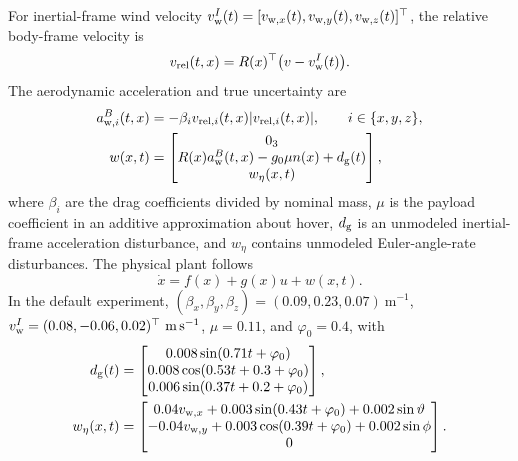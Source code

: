 \documentclass[11pt]{article}
\begin{document}
For inertial-frame wind velocity
$v_{\rm w}^I(t)=[v_{{\rm w},x}(t),v_{{\rm w},y}(t),v_{{\rm w},z}(t)]^\top$,
the relative body-frame velocity is
\begin{equation}
    v_{\rm rel}(t,x)=R(x)^\top\big(v-v_{\rm w}^I(t)\big).
\end{equation}
The aerodynamic acceleration and true uncertainty are
\begin{align}
    a_{{\rm w},i}^B(t,x)&=-\beta_i v_{{\rm rel},i}(t,x)
        |v_{{\rm rel},i}(t,x)|,\qquad i\in\{x,y,z\},\\
    w(x,t)&=\begin{bmatrix}
        0_3\\
        R(x)a_{\rm w}^B(t,x)-g_0\mu n(x)+d_{\rm g}(t)\\
        w_\eta(x,t)
    \end{bmatrix},\label{eq:quad-uncertainty}
\end{align}
where $\beta_i$ are the drag coefficients divided by nominal mass,
$\mu$ is the payload coefficient in an additive approximation about
hover, $d_{\rm g}$ is an unmodeled inertial-frame acceleration disturbance,
and $w_\eta$ contains unmodeled Euler-angle-rate disturbances.
The physical plant follows
\begin{equation}\label{eq:quad-plant}
    \dot x=f(x)+g(x)u+w(x,t).
\end{equation}
In the default experiment,
$(\beta_x,\beta_y,\beta_z)=(0.09,0.23,0.07)~\mathrm{m^{-1}}$,
$v_{\rm w}^I=(0.08,-0.06,0.02)^\top~\mathrm{m\,s^{-1}}$,
$\mu=0.11$, and $\varphi_0=0.4$, with
\begin{align}
    d_{\rm g}(t)&=\begin{bmatrix}
        0.008\sin(0.71t+\varphi_0)\\
        0.008\cos(0.53t+0.3+\varphi_0)\\
        0.006\sin(0.37t+0.2+\varphi_0)
    \end{bmatrix},\\
    w_\eta(x,t)&=\begin{bmatrix}
        0.04v_{{\rm w},x}+0.003\sin(0.43t+\varphi_0)+0.002\sin\vartheta\\
        -0.04v_{{\rm w},y}+0.003\cos(0.39t+\varphi_0)+0.002\sin\phi\\
        0
    \end{bmatrix}.
\end{align}
\end{document}
